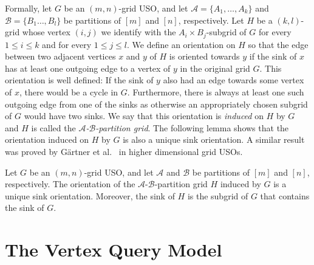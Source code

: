 \documentclass[runningheads,a4paper]{llncs}
\newcommand{\A}{\ensuremath{\mathcal A}}
\newcommand{\B}{\ensuremath{\mathcal B}}
\newcommand{\abpart}{$\A$-$\B$-partition grid\xspace}
\begin{document}
Formally, let $G$ be an $(m,n)$-grid USO,
and let $\A = \{A_1,\ldots,A_k\}$ and $\B = \{B_1\ldots, B_l\}$ be partitions of $[m]$ and $[n]$, respectively.
Let $H$ be a $(k,l)$-grid whose vertex $(i,j)$ we identify with the $A_i \times B_j$-subgrid of $G$ for every $1\leq i \leq k$ and for every $1 \leq j \leq l$. 
We define an orientation on $H$ so that the edge between two adjacent vertices $x$ and $y$ of $H$ is oriented towards $y$ if the sink of $x$ has at least one outgoing edge to a vertex of $y$ in the original grid $G$. 
This orientation is well defined: If the sink of $y$ also had an edge towards some vertex of $x$, there would be a cycle in $G$. 
Furthermore, there is always at least one such outgoing edge from one of the sinks as otherwise an appropriately chosen subgrid of $G$ would have two sinks. 
We say that this orientation is \emph{induced} on $H$ by $G$ and $H$ is called the \emph{\abpart}. 
The following lemma shows that the orientation induced on $H$ by $G$ is also a unique sink orientation. 
A similar result was proved by G\"artner et al.~\cite{grid08} in higher dimensional grid USOs.




\begin{lemma}[$*$]\label{lemma:USO-Lemma}
Let $G$ be an $(m,n)$-grid USO,
and let $\A$ and $\B$ be partitions of $[m]$ and $[n]$, respectively.
The orientation of the $\A$-$\B$-partition grid $H$ induced by $G$ is a unique sink orientation.
Moreover, the sink of $H$ is the subgrid of $G$ that contains the sink of $G$.
\end{lemma}


\section{The Vertex Query Model}
\label{section:The vertex query model}
\end{document}
